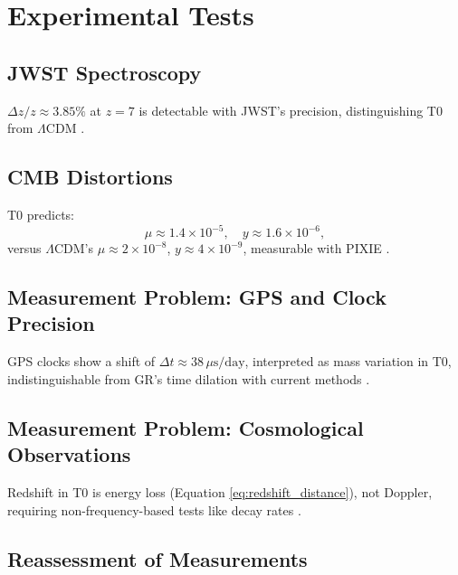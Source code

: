 \documentclass[twocolumn,aps,prl]{revtex4-2}
\newcommand{\LCDM}{\Lambda\text{CDM}}
\begin{document}
	\section{Experimental Tests}
	\label{sec:tests}
	
	\subsection{JWST Spectroscopy}
	\label{subsec:jwst_test}
	
	\(\Delta z / z \approx 3.85\%\) at \(z = 7\) is detectable with JWST's precision, distinguishing T0 from \(\LCDM\) \cite{pascher_params_2025}.
	
	\subsection{CMB Distortions}
	\label{subsec:cmb_distortions_test}
	
	T0 predicts:
	\begin{equation}
		\mu \approx 1.4 \times 10^{-5}, \quad y \approx 1.6 \times 10^{-6},
		\label{eq:distortion_parameters}
	\end{equation}
	versus \(\LCDM\)'s \(\mu \approx 2 \times 10^{-8}\), \(y \approx 4 \times 10^{-9}\), measurable with PIXIE \cite{pascher_temp_2025}.
	
	\subsection{Measurement Problem: GPS and Clock Precision}
	\label{subsec:gps_clock_problem}
	
	GPS clocks show a shift of \(\Delta t \approx 38 \, \mu\text{s/day}\), interpreted as mass variation in T0, indistinguishable from GR's time dilation with current methods \cite{pascher_quantum_2025}.
	
	\subsection{Measurement Problem: Cosmological Observations}
	\label{subsec:cosmological_measurement_problem}
	
	Redshift in T0 is energy loss (Equation \ref{eq:redshift_distance}), not Doppler, requiring non-frequency-based tests like decay rates \cite{pascher_alphabeta_2025}.
	
	\subsection{Reassessment of Measurements}
	\label{subsec:reassessment_measurements}
	
\end{document}
